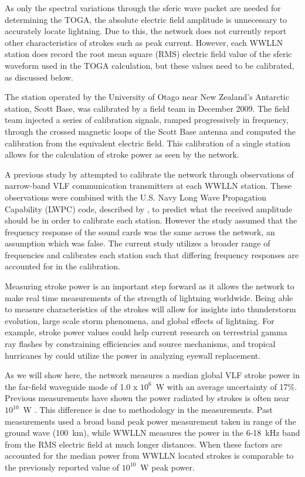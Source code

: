 As only the spectral variations through the sferic wave packet are needed for determining the TOGA, the absolute electric field amplitude is unnecessary to accurately locate lightning. Due to this, the network does not currently report other characteristics of strokes such as peak current.
However, each WWLLN station does record the root mean square (RMS) electric field value of the sferic waveform used in the TOGA calculation, but these values need to be calibrated, as discussed below.

The station operated by the University of Otago near New Zealand's Antarctic station, Scott Base, was calibrated by a field team in December 2009.
The field team injected a series of calibration signals, ramped progressively in frequency, through the crossed magnetic loops of the Scott Base antenna and computed the calibration from the equivalent electric field.
This calibration of a single station allows for the calculation of stroke power as seen by the network.

A previous study by \citet{Rodger2006} attempted to calibrate the network through observations of narrow-band VLF communication transmitters at each WWLLN station.
These observations were combined with the U.S. Navy Long Wave Propagation Capability (LWPC) code, described by \citet{Ferguson1998}, to predict what the received amplitude should be in order to calibrate each station.
However the study assumed that the frequency response of the sound cards was the same across the network, an assumption which was false.
The current study utilizes a broader range of frequencies and calibrates each station such that differing frequency responses are accounted for in the calibration.

Measuring stroke power is an important step forward as it allows the network to make real time measurements of the strength of lightning worldwide.
Being able to measure characteristics of the strokes will allow for insights into thunderstorm evolution, large scale storm phenomena, and global effects of lightning.
For example, stroke power values could help current research on terrestrial gamma ray flashes by \citet{Briggs2011} constraining efficiencies and source mechanisms, and tropical hurricanes by \citet{Thomas2010d} could utilize the power in analyzing eyewall replacement.

As we will show here, the network measures a median global VLF stroke power in the far-field waveguide mode of 1.0 x $10^6$~W with an average uncertainty of 17\%.
Previous measurements have shown the power radiated by strokes is often near $10^{10}$~W \citep{Krider1983}. This difference is due to methodology in the measurements.
Past measurements used a broad band peak power measurement taken in range of the ground wave (100~km), while WWLLN measures the power in the 6-18~kHz band from the RMS electric field at much longer distances.
When these factors are accounted for the median power from WWLLN located strokes is comparable to the previously reported value of $10^{10}$~W peak power.

